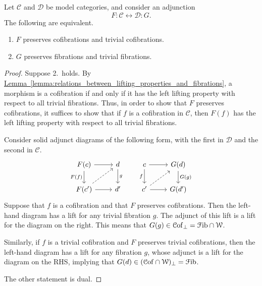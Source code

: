 \documentclass[main.tex]{subfiles}
\begin{document}
\begin{proposition}
  \label{prop:equivalent_conditions_for_quillen_adjunction}
  Let $\mathcal{C}$ and $\mathcal{D}$ be model categories, and consider an adjunction
  \begin{equation*}
    F : \mathcal{C} \leftrightarrow \mathcal{D} : G.
  \end{equation*}
  The following are equivalent.
  \begin{enumerate}
    \item $F$ preserves cofibrations and trivial cofibrations.

    \item $G$ preserves fibrations and trivial fibrations.
  \end{enumerate}
\end{proposition}
\begin{proof}
  Suppose 2.\ holds. By \hyperref[lemma:relations_between_lifting_properties_and_fibrations]{Lemma~\ref*{lemma:relations_between_lifting_properties_and_fibrations}}, a morphism is a cofibration if and only if it has the left lifting property with respect to all trivial fibrations. Thus, in order to show that $F$ preserves cofibrations, it suffices to show that if $f$ is a cofibration in $\mathcal{C}$, then $F(f)$ has the left lifting property with respect to all trivial fibrations.

  Consider solid adjunct diagrams of the following form, with the first in $\mathcal{D}$ and the second in $\mathcal{C}$.
  \begin{equation*}
    \begin{tikzcd}
      F(c)
      \arrow[r]
      \arrow[d, swap, "F(f)"]
      & d
      \arrow[d, "g"]
      \\
      F(c')
      \arrow[r]
      \arrow[ur, dashed]
      & d'
    \end{tikzcd}
    \qquad
    \begin{tikzcd}
      c
      \arrow[r]
      \arrow[d, swap, "f"]
      & G(d)
      \arrow[d, "G(g)"]
      \\
      c'
      \arrow[r]
      \arrow[ur, dashed]
      & G(d')
    \end{tikzcd}
  \end{equation*}
  Suppose that $f$ is a cofibration and that $F$ preserves cofibrations. Then the left-hand diagram has a lift for any trivial fibration $g$. The adjunct of this lift is a lift for the diagram on the right. This means that $G(g) \in \mathcal{C}\mathrm{of}_{\perp} = \mathcal{F}\mathrm{ib} \cap \mathcal{W}$.

  Similarly, if $f$ is a trivial cofibration and $F$ preserves trivial cofibrations, then the left-hand diagram has a lift for any fibration $g$, whose adjunct is a lift for the diagram on the RHS, implying that $G(d) \in (\mathcal{C}\mathrm{of} \cap \mathcal{W})_{\perp} = \mathcal{F}\mathrm{ib}$.

  The other statement is dual.
\end{proof}
\end{document}
